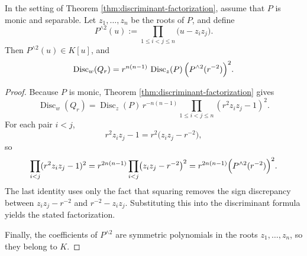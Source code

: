 \begin{corollary}\label{cor:discriminant-wedge2-square}
In the setting of Theorem \ref{thm:discriminant-factorization}, assume that \(P\) is monic and separable. Let \(z_1,\dots,z_n\) be the roots of \(P\), and define
\[
P^{\wedge 2}(u):=\prod_{1\le i<j\le n}\bigl(u-z_i z_j\bigr).
\]
Then \(P^{\wedge 2}(u)\in K[u]\), and
\[
\operatorname{Disc}_{w}(Q_r)
=r^{n(n-1)}\,\operatorname{Disc}_{z}(P)\,\Bigl(P^{\wedge 2}(r^{-2})\Bigr)^2.
\]
\end{corollary}

\begin{proof}
Because \(P\) is monic, Theorem \ref{thm:discriminant-factorization} gives
\[
\operatorname{Disc}_{w}(Q_r)
=\operatorname{Disc}_{z}(P)\,
r^{-n(n-1)}
\prod_{1\le i<j\le n}(r^2 z_i z_j-1)^2.
\]
For each pair \(i<j\),
\[
r^2 z_i z_j-1=r^2\bigl(z_i z_j-r^{-2}\bigr),
\]
so
\[
\prod_{i<j}(r^2 z_i z_j-1)^2
=r^{2n(n-1)}\prod_{i<j}\bigl(z_i z_j-r^{-2}\bigr)^2
=r^{2n(n-1)}\Bigl(P^{\wedge 2}(r^{-2})\Bigr)^2.
\]
The last identity uses only the fact that squaring removes the sign discrepancy between \(z_i z_j-r^{-2}\) and \(r^{-2}-z_i z_j\). Substituting this into the discriminant formula yields the stated factorization.

Finally, the coefficients of \(P^{\wedge 2}\) are symmetric polynomials in the roots \(z_1,\dots,z_n\), so they belong to \(K\).
\end{proof}
